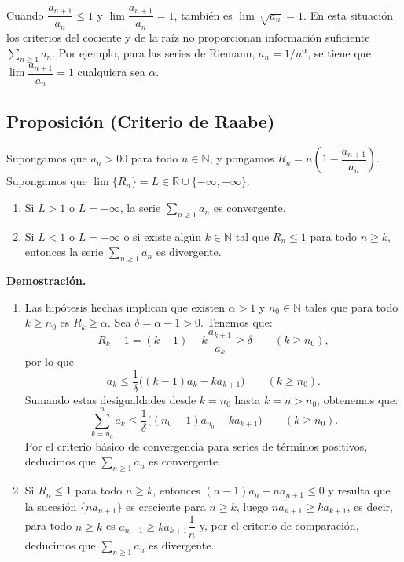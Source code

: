 \documentclass[10pt,a4paper]{article}
\begin{document}
	Cuando $\dfrac{a_{n+1}}{a_n} \leq 1$ y $\lim \dfrac{a_{n+1}}{a_n} = 1$, también es $\lim\sqrt[n]{a_n} = 1$. En esta situación los criterios del cociente y de la raíz no proporcionan información suficiente $\displaystyle \sum_{n \geq 1} a_n$. Por ejemplo, para las series de Riemann, $a_n = 1/ n^\alpha$, se tiene que $\lim \dfrac{a_{n+1}}{a_n} = 1$ cualquiera sea $\alpha$.
	
	\subsection{Proposición (Criterio de Raabe)}
	Supongamos que $a_n >0 0$ para todo $n \in \mathbb{N}$, y pongamos $R_n = n \left(1 - \dfrac{a_{n+1}}{a_n}\right)$. Supongamos que $\lim\{R_n\} = L \in \mathbb{R} \cup \{- \infty, + \infty\}$.
	\begin{enumerate}[label = \roman*)]
		\item Si $L > 1$ o $L = + \infty$, la serie $\displaystyle \sum_{n \geq 1} a_n$ es convergente.
		\item Si $L < 1$ o $L = - \infty$ o si existe algún $k \in \mathbb{N}$ tal que $R_n \leq 1$ para todo $n \geq k$, entonces la serie $\displaystyle \sum_{n \geq 1} a_n$ es divergente.
	\end{enumerate}	

	\textbf{Demostración. }
	\begin{enumerate}[label = \roman*)]
		\item Las hipótesis hechas implican que existen $\alpha > 1$ y $ n_0 \in \mathbb{N}$ tales que para todo $k \geq n_0$ es $R_k \geq \alpha$. Sea $\delta = \alpha - 1 > 0$. Tenemos que:
		$$R_k - 1 = (k-1) -k \dfrac{a_{k+1}}{a_k} \geq \delta \qquad (k \geq n_0),$$
		por lo que
		$$a_k \leq \dfrac{1}{\delta} \big((k-1)a_k - k a_{k+1}\big) \qquad (k \geq n_0).$$
		Sumando estas desigualdades desde $k = n_0$ hasta $k = n > n_0$, obtenemos que:
		$$ \sum_{k = n_0}^n a_k \leq \dfrac{1}{\delta} \big((n_0 -1)a_{n_0} - k a_{k+1}\big) \qquad (k \geq n_0).$$
		Por el criterio básico de convergencia para series de términos positivos, deducimos que $\displaystyle \sum_{n \geq 1}a_n$ es convergente.
		\item Si $R_n \leq 1$ para todo $n \geq k$, entonces $(n-1) a_n - n a_{n+1} \leq 0$ y resulta que la sucesión $\{na_{n+1}\}$ es creciente para $n \geq k$, luego $na_{n+1} \geq k a_{k+1}$, es decir, para todo $n \geq k$ es $a_{n+1} \geq k a_{k+1} \dfrac{1}{n}$ y, por el criterio de comparación, deducimos que $\displaystyle \sum_{n \geq 1}a_n$ es divergente.
	\end{enumerate}
	
\end{document}
